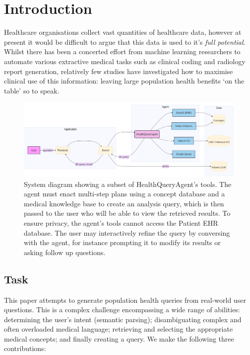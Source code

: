 \documentclass[11pt]{article}
\begin{document}
\section{Introduction}

Healthcare organisations collect vast quantities of healthcare data, however at present it would be difficult to argue that this data is used to it's \textit{full potential}. Whilst there has been a concerted effort from machine learning researchers to automate various extractive medical tasks such as clinical coding and radiology report generation, relatively few studies have investigated how to maximise clinical use of this information: leaving large population health benefits `on the table' so to speak.



\begin{figure}[t]
  \includegraphics[width=\linewidth]{content/system_diagram3.png}
	\caption{System diagram showing a subset of HealthQueryAgent's tools. The agent must enact multi-step plans using a concept database and a medical knowledge base to create an analysis query, which is then passed to the user who will be able to view the retrieved results. To ensure privacy, the agent's tools cannot access the Patient EHR database. The user may interactively refine the query by conversing with the agent, for instance prompting it to modify its results or asking follow up questions.}
	\label{fig:system-diagram}
\end{figure}


\subsection{Task}
This paper attempts to generate population health queries from real-world user questions.
This is a complex challenge encompassing a wide range of abilities: determining the user's intent (semantic parsing); disambiguating complex and often overloaded medical language; retrieving and selecting the appropriate medical concepts; and finally creating a query.
We make the following three contributions:
\end{document}
